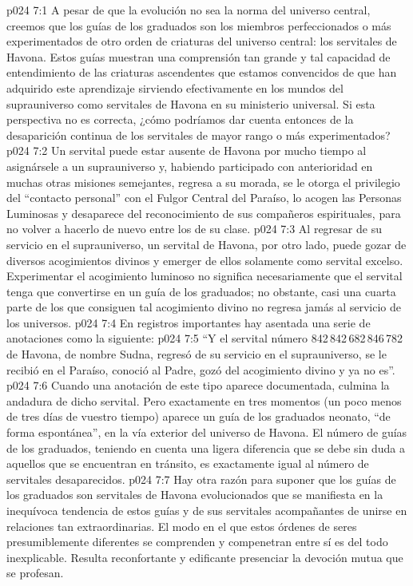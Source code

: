 \vs p024 7:1 A pesar de que la evolución no sea la norma del universo central, creemos que los guías de los graduados son los miembros perfeccionados o más experimentados de otro orden de criaturas del universo central: los servitales de Havona. Estos guías muestran una comprensión tan grande y tal capacidad de entendimiento de las criaturas ascendentes que estamos convencidos de que han adquirido este aprendizaje sirviendo efectivamente en los mundos del suprauniverso como servitales de Havona en su ministerio universal. Si esta perspectiva no es correcta, ¿cómo podríamos dar cuenta entonces de la desaparición continua de los servitales de mayor rango o más experimentados?
\vs p024 7:2 Un servital puede estar ausente de Havona por mucho tiempo al asignársele a un suprauniverso y, habiendo participado con anterioridad en muchas otras misiones semejantes, regresa a su morada, se le otorga el privilegio del “contacto personal” con el Fulgor Central del Paraíso, lo acogen las Personas Luminosas y desaparece del reconocimiento de sus compañeros espirituales, para no volver a hacerlo de nuevo entre los de su clase.
\vs p024 7:3 Al regresar de su servicio en el suprauniverso, un servital de Havona, por otro lado, puede gozar de diversos acogimientos divinos y emerger de ellos solamente como servital excelso. Experimentar el acogimiento luminoso no significa necesariamente que el servital tenga que convertirse en un guía de los graduados; no obstante, casi una cuarta parte de los que consiguen tal acogimiento divino no regresa jamás al servicio de los universos.
\vs p024 7:4 \pc En registros importantes hay asentada una serie de anotaciones como la siguiente:
\vs p024 7:5 “Y el servital número 842\,842\,682\,846\,782 de Havona, de nombre Sudna, regresó de su servicio en el suprauniverso, se le recibió en el Paraíso, conoció al Padre, gozó del acogimiento divino y ya no es”.
\vs p024 7:6 Cuando una anotación de este tipo aparece documentada, culmina la andadura de dicho servital. Pero exactamente en tres momentos (un poco menos de tres días de vuestro tiempo) aparece un guía de los graduados neonato, “de forma espontánea”, en la vía exterior del universo de Havona. El número de guías de los graduados, teniendo en cuenta una ligera diferencia que se debe sin duda a aquellos que se encuentran en tránsito, es exactamente igual al número de servitales desaparecidos.
\vs p024 7:7 \pc Hay otra razón para suponer que los guías de los graduados son servitales de Havona evolucionados que se manifiesta en la inequívoca tendencia de estos guías y de sus servitales acompañantes de unirse en relaciones tan extraordinarias. El modo en el que estos órdenes de seres presumiblemente diferentes se comprenden y compenetran entre sí es del todo inexplicable. Resulta reconfortante y edificante presenciar la devoción mutua que se profesan.
